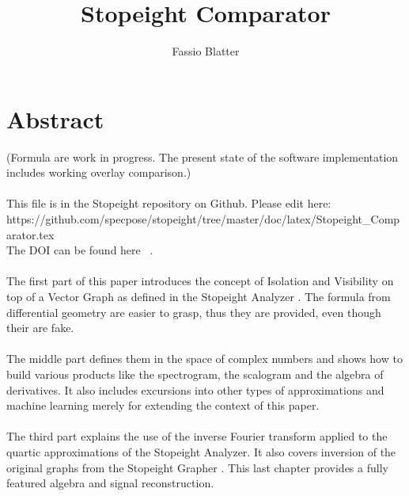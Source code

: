 \documentclass{report}
\begin{document}
\title{Stopeight Comparator}
\author{Fassio Blatter}
\maketitle

\chapter{Abstract}
(Formula are work in progress. The present state of the software implementation includes working overlay comparison.)\\\\
This file is in the Stopeight repository on Github. Please edit here:\\
https://github.com/specpose/stopeight/tree/master/doc/latex/Stopeight\_Comparator.tex\\
The DOI can be found here ~\cite{Analyzer}.\\\\
The first part of this paper introduces the concept of Isolation and Visibility on top of a Vector Graph as defined in the Stopeight Analyzer\cite{Analyzer} . The formula from differential geometry are easier to grasp, thus they are provided, even though their are fake.\\\\
The middle part defines them in the space of complex numbers and shows how to build various products like the spectrogram, the scalogram and the algebra of derivatives. It also includes excursions into other types of approximations and machine learning merely for extending the context of this paper.\\\\
The third part explains the use of the inverse Fourier transform applied to the quartic approximations of the Stopeight Analyzer\cite{Analyzer}. It also covers inversion of the original graphs from the Stopeight Grapher\cite{Grapher} . This last chapter provides a fully featured algebra and signal reconstruction.
\end{document}
